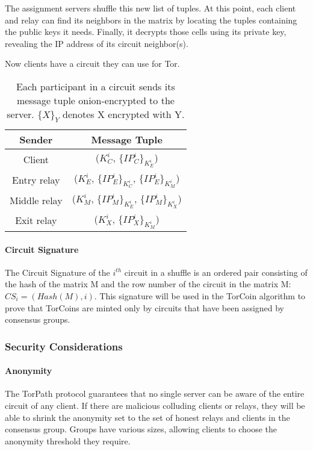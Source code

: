 The assignment servers shuffle this new list of tuples. At this point, each
client and relay can find its neighbors in the matrix by locating the tuples
containing the public keys it needs. Finally, it decrypts those cells using
its private key, revealing the IP address of its circuit neighbor(s).

Now clients have a circuit they can use for Tor.

{\renewcommand{\arraystretch}{2}
\begin{table}[h]
\centering
  \begin{tabular}{ |c || c| }
  \hline
  \textbf{Sender} & \textbf{Message Tuple} \\ \hline
  Client & ($K^{i}_{C}$, $\{IP^{i}_{C}\}_{K^{i}_{E}}$) \\ \hline
  Entry relay & ($K^{i}_{E}$, $\{IP^{i}_{E}\}_{K^{i}_{C}}$, $\{IP^{i}_{E}\}_{K^{i}_{M}}$) \\ \hline
  Middle relay & ($K^{i}_{M}$, $\{IP^{i}_{M}\}_{K^{i}_{E}}$, $\{IP^{i}_{M}\}_{K^{i}_{X}}$) \\ \hline
  Exit relay & ($K^{i}_{X}$, $\{IP^{i}_{X}\}_{K^{i}_{M}}$) \\ \hline
  \end{tabular}
  \caption{Each participant in a circuit sends its message 
  tuple onion-encrypted to the server. $\{X\}_{Y}$ denotes X encrypted with Y.}
  \label{table:message_format}
\end{table}

\paragraph{Circuit Signature} The Circuit Signature of the $i^{th}$ circuit in
a shuffle is an ordered pair consisting of the hash of the matrix M and the
row number of the circuit in the matrix M: $CS_i = (Hash(M), i)$. This
signature will be used in the TorCoin algorithm to prove that TorCoins are
minted only by circuits that have been assigned by consensus groups.

\subsubsection{Security Considerations} 

\paragraph{Anonymity} The TorPath protocol guarantees that no single
server can be aware of the entire circuit of any client. If there are malicious
colluding clients or relays, they will be able to shrink the anonymity set to
the set of honest relays and clients in the consensus group.  Groups have
various sizes, allowing clients to choose the anonymity threshold they
require.

}
